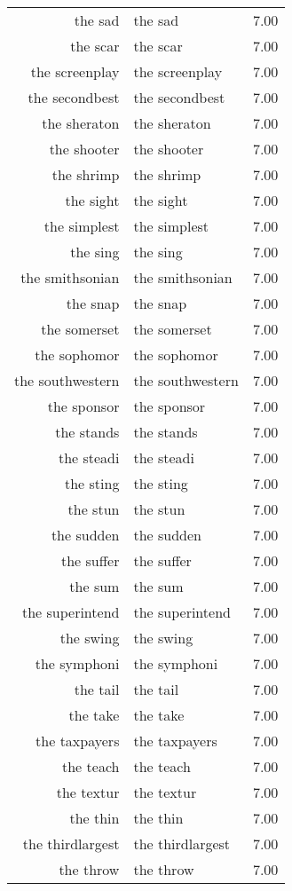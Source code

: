 \begin{table}[ht]
\begin{tabular}{rlr}
  the sad & the sad & 7.00 \\ 
  the scar & the scar & 7.00 \\ 
  the screenplay & the screenplay & 7.00 \\ 
  the secondbest & the secondbest & 7.00 \\ 
  the sheraton & the sheraton & 7.00 \\ 
  the shooter & the shooter & 7.00 \\ 
  the shrimp & the shrimp & 7.00 \\ 
  the sight & the sight & 7.00 \\ 
  the simplest & the simplest & 7.00 \\ 
  the sing & the sing & 7.00 \\ 
  the smithsonian & the smithsonian & 7.00 \\ 
  the snap & the snap & 7.00 \\ 
  the somerset & the somerset & 7.00 \\ 
  the sophomor & the sophomor & 7.00 \\ 
  the southwestern & the southwestern & 7.00 \\ 
  the sponsor & the sponsor & 7.00 \\ 
  the stands & the stands & 7.00 \\ 
  the steadi & the steadi & 7.00 \\ 
  the sting & the sting & 7.00 \\ 
  the stun & the stun & 7.00 \\ 
  the sudden & the sudden & 7.00 \\ 
  the suffer & the suffer & 7.00 \\ 
  the sum & the sum & 7.00 \\ 
  the superintend & the superintend & 7.00 \\ 
  the swing & the swing & 7.00 \\ 
  the symphoni & the symphoni & 7.00 \\ 
  the tail & the tail & 7.00 \\ 
  the take & the take & 7.00 \\ 
  the taxpayers & the taxpayers & 7.00 \\ 
  the teach & the teach & 7.00 \\ 
  the textur & the textur & 7.00 \\ 
  the thin & the thin & 7.00 \\ 
  the thirdlargest & the thirdlargest & 7.00 \\ 
  the throw & the throw & 7.00 \\ 

\end{tabular}
\end{table}
